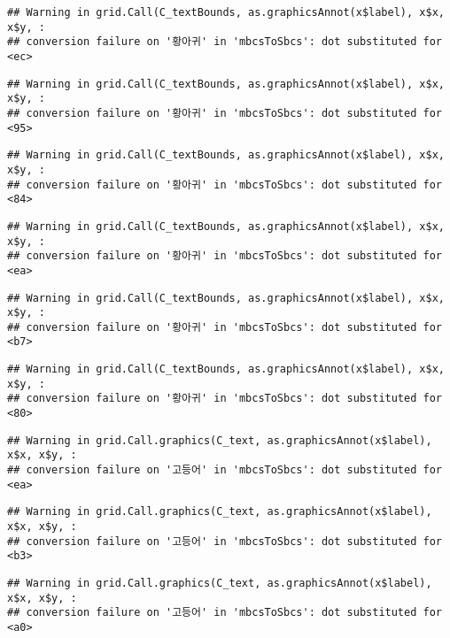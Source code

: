 \documentclass[
]{article}
\begin{document}
\begin{verbatim}
## Warning in grid.Call(C_textBounds, as.graphicsAnnot(x$label), x$x, x$y, :
## conversion failure on '황아귀' in 'mbcsToSbcs': dot substituted for <ec>
\end{verbatim}

\begin{verbatim}
## Warning in grid.Call(C_textBounds, as.graphicsAnnot(x$label), x$x, x$y, :
## conversion failure on '황아귀' in 'mbcsToSbcs': dot substituted for <95>
\end{verbatim}

\begin{verbatim}
## Warning in grid.Call(C_textBounds, as.graphicsAnnot(x$label), x$x, x$y, :
## conversion failure on '황아귀' in 'mbcsToSbcs': dot substituted for <84>
\end{verbatim}

\begin{verbatim}
## Warning in grid.Call(C_textBounds, as.graphicsAnnot(x$label), x$x, x$y, :
## conversion failure on '황아귀' in 'mbcsToSbcs': dot substituted for <ea>
\end{verbatim}

\begin{verbatim}
## Warning in grid.Call(C_textBounds, as.graphicsAnnot(x$label), x$x, x$y, :
## conversion failure on '황아귀' in 'mbcsToSbcs': dot substituted for <b7>
\end{verbatim}

\begin{verbatim}
## Warning in grid.Call(C_textBounds, as.graphicsAnnot(x$label), x$x, x$y, :
## conversion failure on '황아귀' in 'mbcsToSbcs': dot substituted for <80>
\end{verbatim}

\begin{verbatim}
## Warning in grid.Call.graphics(C_text, as.graphicsAnnot(x$label), x$x, x$y, :
## conversion failure on '고등어' in 'mbcsToSbcs': dot substituted for <ea>
\end{verbatim}

\begin{verbatim}
## Warning in grid.Call.graphics(C_text, as.graphicsAnnot(x$label), x$x, x$y, :
## conversion failure on '고등어' in 'mbcsToSbcs': dot substituted for <b3>
\end{verbatim}

\begin{verbatim}
## Warning in grid.Call.graphics(C_text, as.graphicsAnnot(x$label), x$x, x$y, :
## conversion failure on '고등어' in 'mbcsToSbcs': dot substituted for <a0>
\end{verbatim}
\end{document}
